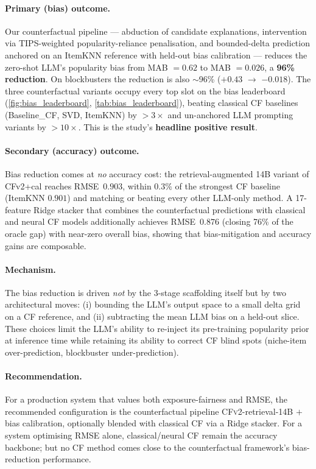 \documentclass[11pt,a4paper]{article}
\begin{document}
\paragraph{Primary (bias) outcome.} Our counterfactual pipeline ---
abduction of candidate explanations, intervention via TIPS-weighted
popularity-reliance penalisation, and bounded-delta prediction anchored
on an ItemKNN reference with held-out bias calibration --- reduces the
zero-shot LLM's popularity bias from MAB $=0.62$ to MAB $=0.026$, a
\textbf{96\% reduction}. On blockbusters the reduction is also $\sim$96\%
($+0.43$ $\to$ $-0.018$). The three counterfactual variants occupy
every top slot on the bias leaderboard (\cref{fig:bias_leaderboard},
\cref{tab:bias_leaderboard}), beating classical CF baselines
(Baseline\_CF, SVD, ItemKNN) by $>3\times$ and un-anchored LLM
prompting variants by $>10\times$. This is the study's \textbf{headline
positive result}.

\paragraph{Secondary (accuracy) outcome.} Bias reduction comes at
\emph{no} accuracy cost: the retrieval-augmented 14B variant of CFv2+cal
reaches RMSE~$0.903$, within $0.3\%$ of the strongest CF baseline
(ItemKNN $0.901$) and matching or beating every other LLM-only method.
A 17-feature Ridge stacker that combines the counterfactual predictions
with classical and neural CF models additionally achieves RMSE~$0.876$
(closing 76\% of the oracle gap) with near-zero overall bias, showing
that bias-mitigation and accuracy gains are composable.

\paragraph{Mechanism.} The bias reduction is driven \emph{not} by the
3-stage scaffolding itself but by two architectural moves: (i) bounding
the LLM's output space to a small delta grid on a CF reference, and
(ii) subtracting the mean LLM bias on a held-out slice. These choices
limit the LLM's ability to re-inject its pre-training popularity prior
at inference time while retaining its ability to correct CF blind spots
(niche-item over-prediction, blockbuster under-prediction).

\paragraph{Recommendation.} For a production system that values both
exposure-fairness and RMSE, the recommended configuration is the
counterfactual pipeline \textsc{CFv2}-retrieval-14B $+$ bias
calibration, optionally blended with classical CF via a Ridge stacker.
For a system optimising RMSE alone, classical/neural CF remain the
accuracy backbone; but no CF method comes close to the counterfactual
framework's bias-reduction performance.
\end{document}
